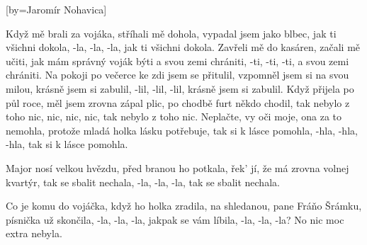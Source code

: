 [by={Jaromír Nohavica}]

\beginverse{}
Když mě brali za vojáka, stříhali mě dohola,
vypadal jsem jako blbec,
jak ti všichni dokola, -la, -la, -la,
jak ti všichni dokola.
Zavřeli mě do kasáren, začali mě učiti,
jak mám správný voják býti
a svou zemi chrániti, -ti, -ti, -ti,
a svou zemi chrániti.
Na pokoji po večerce ke zdi jsem se přitulil,
vzpomněl jsem si na svou milou,
krásně jsem si zabulil, -lil, -lil, -lil,
krásně jsem si zabulil.
Když přijela po půl roce, měl jsem zrovna zápal plic,
po chodbě furt někdo chodil,
tak nebylo z toho nic, nic, nic, nic,
tak nebylo z toho nic.
Neplačte, vy oči moje, ona za to nemohla,
protože mladá holka lásku potřebuje,
tak si k lásce pomohla, -hla, -hla, -hla,
tak si k lásce pomohla.
\endverse{}

\beginverse{}
Major nosí velkou hvězdu, před branou ho potkala,
řek' jí, že má zrovna volnej kvartýr,
tak se sbalit nechala, -la, -la, -la,
tak se sbalit nechala.
\endverse{}

\beginverse{}
Co je komu do vojáčka, když ho holka zradila,
na shledanou, pane Fráňo Šrámku,
písnička už skončila, -la, -la, -la,
jakpak se vám líbila, -la, -la, -la?
No nic moc extra nebyla.
\endverse{}

\endsong{}
